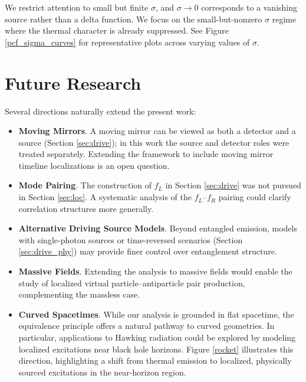 \documentclass[12pt,a4paper]{article}
\begin{document}
{We restrict attention to small but finite $\sigma$, and $\sigma \rightarrow 0$ corresponds to a vanishing source rather than a delta function. We focus on the small-but-nonzero $\sigma$ regime where the thermal character is already suppressed. See Figure \ref{pcf_sigma_curves} for representative plots across varying values of $\sigma$.

\section{Future Research} \label{sec:future}

Several directions naturally extend the present work:
\begin{itemize}
\item {\bf Moving Mirrors}. A moving mirror can be viewed as both a detector and a source (Section \ref{sec:drive}); in this work the source and detector roles were treated separately. Extending the framework to include moving mirror timeline localizations is an open question.

\item {\bf Mode Pairing}. The construction of $f_L$ in Section \ref{sec:drive} was not pursued in Section \ref{sec:loc}. A systematic analysis of the $f_L$–$f_R$ pairing could clarify correlation structures more generally.

\item {\bf Alternative Driving Source Models}. Beyond entangled emission, models with single-photon sources or time-reversed scenarios (Section \ref{sec:drive_phy}) may provide finer control over entanglement structure.

\item {\bf Massive Fields}. Extending the analysis to massive fields would enable the study of localized virtual particle–antiparticle pair production, complementing the massless case.

\item {\bf Curved Spacetimes}. While our analysis is grounded in flat spacetime, the equivalence principle offers a natural pathway to curved geometries. In particular, applications to Hawking radiation could be explored by modeling localized excitations near black hole horizons. Figure \ref{rocket} illustrates this direction, highlighting a shift from thermal emission to localized, physically sourced excitations in the near-horizon region.

\end{itemize}

}
\end{document}
